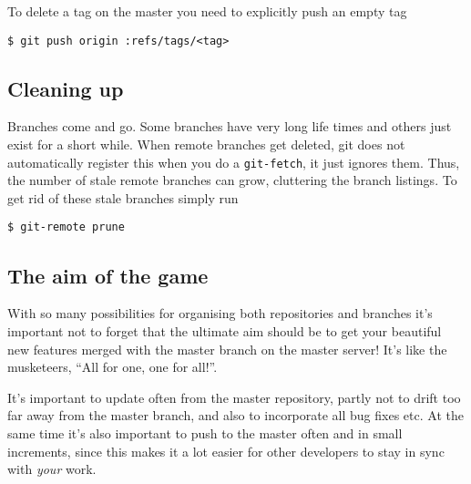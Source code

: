 \documentclass[a4paper,10pt]{article}
\begin{document}
To delete a tag on the master you need to explicitly push an empty tag
\begin{verbatim}
$ git push origin :refs/tags/<tag>
\end{verbatim}

\subsection{Cleaning up}
Branches come and go. Some branches have very long life times and others just
exist for a short while. When remote branches get deleted, git does not
automatically register this when you do a \texttt{git-fetch}, it just ignores
them. Thus, the number of stale remote branches can grow, cluttering the
branch listings. To get rid of these stale branches simply run 
\begin{verbatim}
$ git-remote prune
\end{verbatim}

\subsection{The aim of the game}
With so many possibilities for organising both repositories and branches it's
important not to forget that the ultimate aim should be to get your beautiful
new features merged with the master branch on the master server! It's like the
musketeers, ``All for one, one for all!''. 

It's important to update often from the master repository, partly not to drift
too far away from the master branch, and also to incorporate all bug fixes
etc. At the same time it's also important to push to the master often and in
small increments, since this makes it a lot easier for other developers to
stay in sync with \emph{your} work.
\end{document}
